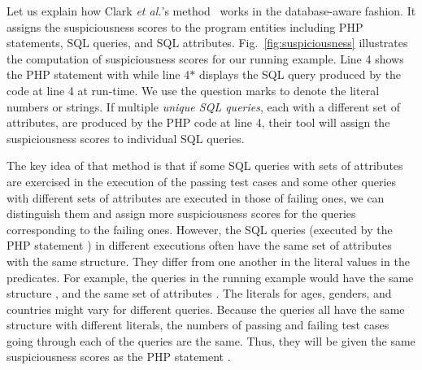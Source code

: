Let us explain how Clark {\em et al.}'s method~\cite{ga-ase11} works
in the database-aware fashion. It assigns the suspiciousness scores to
the program entities including PHP statements, SQL queries, and SQL
attributes.  Fig.~\ref{fig:suspiciousness} illustrates the computation
of suspiciousness scores for our running example. Line 4 shows
the PHP statement with  while line 4$\ast$ displays
the SQL query produced by the code at line 4 at run-time. We use
the question marks to denote the literal numbers or strings.
%
%
If multiple {\em unique SQL queries}, each with a different set of
attributes, are produced by the PHP code at line 4, their tool will assign
the suspiciousness scores to individual SQL queries.


The key idea of that method is that if some SQL queries with sets of
attributes are exercised in the execution of the passing test cases
and some other queries with different sets of attributes are executed
in those of failing ones, we can distinguish them and assign more
suspiciousness scores for the queries corresponding to the failing
ones. However, the SQL queries (executed by the PHP statement
) in different executions often have the same set
of attributes with the same structure. They differ from one another in
the literal values in the predicates. For example, the queries in the
running example would have the same structure , and the
same set of attributes . The
literals for ages, genders, and countries might vary for different
queries. Because the queries all have the same structure with
different literals, the numbers of passing and failing test cases
going through each of the queries are the same. Thus, they will be
given the same suspiciousness scores as the PHP statement
.

